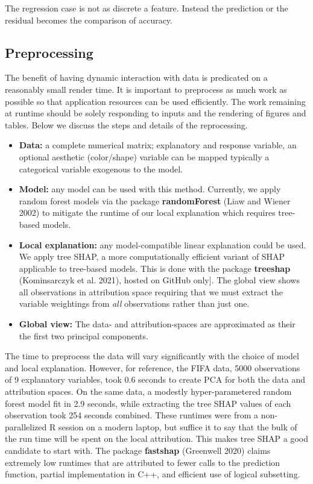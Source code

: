 \documentclass[
]{article}
\begin{document}
The regression case is not as discrete a feature. Instead the prediction or the residual becomes the comparison of accuracy.

\hypertarget{preprocessing}{%
\subsection{Preprocessing}\label{preprocessing}}

The benefit of having dynamic interaction with data is predicated on a reasonably small render time. It is important to preprocess as much work as possible so that application resources can be used efficiently. The work remaining at runtime should be solely responding to inputs and the rendering of figures and tables. Below we discuss the steps and details of the reprocessing.




\begin{itemize}
    \item \textbf{Data:} a complete numerical matrix; explanatory and response variable, an optional aesthetic (color/shape) variable can be mapped typically a categorical variable exogenous to the model.
    \item \textbf{Model:} any model can be used with this method. Currently, we apply random forest models via the package \textbf{randomForest} (Liaw and Wiener 2002) to mitigate the runtime of our local explanation which requires tree-based models.
    \item \textbf{Local explanation:} any model-compatible linear explanation could be used. We apply tree SHAP, a more computationally efficient variant of SHAP applicable to tree-based models. This is done with the package \textbf{treeshap} (Kominsarczyk et al. 2021), hosted on GitHub only]. The global view shows all observations in attribution space requiring that we must extract the variable weightings from \emph{all} observations rather than just one.
    \item \textbf{Global view:} The data- and attribution-spaces are approximated as their the first two principal components.
\end{itemize}

The time to preprocess the data will vary significantly with the choice of model and local explanation. However, for reference, the FIFA data, 5000 observations of 9 explanatory variables, took 0.6 seconds to create PCA for both the data and attribution spaces. On the same data, a modestly hyper-parametered random forest model fit in 2.9 seconds, while extracting the tree SHAP values of each observation took 254 seconds combined. These runtimes were from a non-parallelized R session on a modern laptop, but suffice it to say that the bulk of the run time will be spent on the local attribution. This makes tree SHAP a good candidate to start with. The package \textbf{fastshap} (Greenwell 2020) claims extremely low runtimes that are attributed to fewer calls to the prediction function, partial implementation in C++, and efficient use of logical subsetting.
\end{document}
